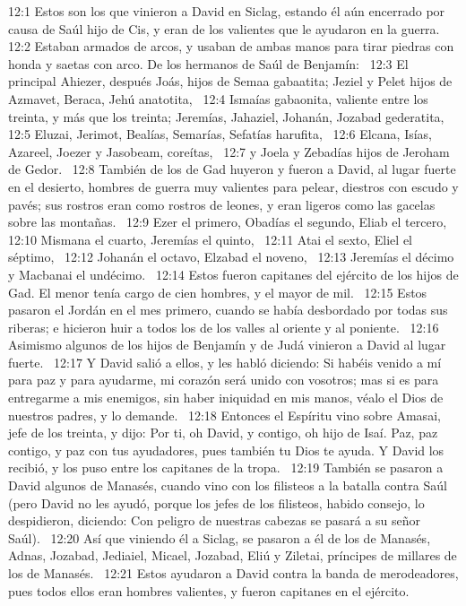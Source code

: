 12:1 Estos son los que vinieron a David en Siclag, estando él aún encerrado por causa de Saúl hijo de Cis, y eran de los valientes que le ayudaron en la guerra.  
12:2 Estaban armados de arcos, y usaban de ambas manos para tirar piedras con honda y saetas con arco. De los hermanos de Saúl de Benjamín:  
12:3 El principal Ahiezer, después Joás, hijos de Semaa gabaatita; Jeziel y Pelet hijos de Azmavet, Beraca, Jehú anatotita,  
12:4 Ismaías gabaonita, valiente entre los treinta, y más que los treinta; Jeremías, Jahaziel, Johanán, Jozabad gederatita,  
12:5 Eluzai, Jerimot, Bealías, Semarías, Sefatías harufita,  
12:6 Elcana, Isías, Azareel, Joezer y Jasobeam, coreítas,  
12:7 y Joela y Zebadías hijos de Jeroham de Gedor.  
12:8 También de los de Gad huyeron y fueron a David, al lugar fuerte en el desierto, hombres de guerra muy valientes para pelear, diestros con escudo y pavés; sus rostros eran como rostros de leones, y eran ligeros como las gacelas sobre las montañas.  
12:9 Ezer el primero, Obadías el segundo, Eliab el tercero,  
12:10 Mismana el cuarto, Jeremías el quinto,  
12:11 Atai el sexto, Eliel el séptimo,  
12:12 Johanán el octavo, Elzabad el noveno,  
12:13 Jeremías el décimo y Macbanai el undécimo.  
12:14 Estos fueron capitanes del ejército de los hijos de Gad. El menor tenía cargo de cien hombres, y el mayor de mil.  
12:15 Estos pasaron el Jordán en el mes primero, cuando se había desbordado por todas sus riberas; e hicieron huir a todos los de los valles al oriente y al poniente.  
12:16 Asimismo algunos de los hijos de Benjamín y de Judá vinieron a David al lugar fuerte.  
12:17 Y David salió a ellos, y les habló diciendo: Si habéis venido a mí para paz y para ayudarme, mi corazón será unido con vosotros; mas si es para entregarme a mis enemigos, sin haber iniquidad en mis manos, véalo el Dios de nuestros padres, y lo demande.  
12:18 Entonces el Espíritu vino sobre Amasai, jefe de los treinta, y dijo: Por ti, oh David, y contigo, oh hijo de Isaí. Paz, paz contigo, y paz con tus ayudadores, pues también tu Dios te ayuda. Y David los recibió, y los puso entre los capitanes de la tropa.  
12:19 También se pasaron a David algunos de Manasés, cuando vino con los filisteos a la batalla contra Saúl (pero David no les ayudó, porque los jefes de los filisteos, habido consejo, lo despidieron, diciendo: Con peligro de nuestras cabezas se pasará a su señor Saúl).  
12:20 Así que viniendo él a Siclag, se pasaron a él de los de Manasés, Adnas, Jozabad, Jediaiel, Micael, Jozabad, Eliú y Ziletai, príncipes de millares de los de Manasés.  
12:21 Estos ayudaron a David contra la banda de merodeadores, pues todos ellos eran hombres valientes, y fueron capitanes en el ejército.  
